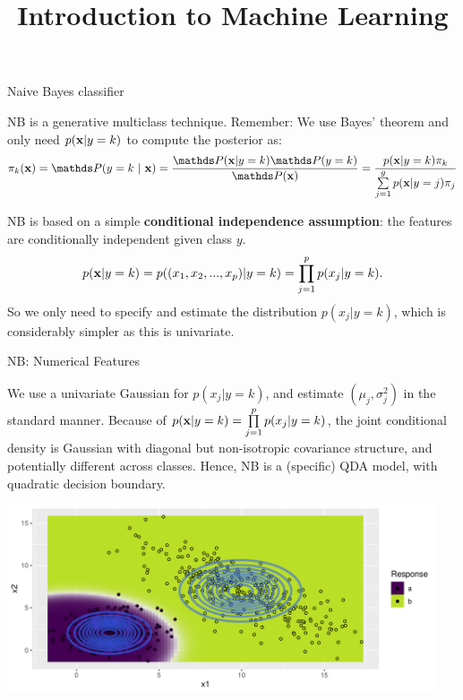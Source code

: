 \documentclass[11pt,compress,t,notes=noshow, xcolor=table]{beamer}
\title{Introduction to Machine Learning}
\begin{document}

\framebreak

\begin{vbframe}{Naive Bayes classifier}

NB is a generative multiclass technique. Remember: We use Bayes' theorem and only need $p(\mathbf{x} | y= k)$ to compute the posterior as:
$$\pikx = \postk = \frac{\P(\xv | y = k) \P(y = k)}{\P(\xv)} = \frac{\pdfxyk \pik}{\sumjg \pdfxyk[j] \pi_j} $$


NB is based on a simple \textbf{conditional independence assumption}: the features are conditionally independent given class $y$.
$$
p(\mathbf{x} | y= k) = p((x_1, x_2, ..., x_p)|y = k)=\prod\limits_{j=1}^p p(x_j|y = k).
$$
So we only need to specify and estimate the distribution $p(x_j|y = k)$, which is considerably simpler as this is univariate.

\end{vbframe}


\begin{vbframe}{NB: Numerical Features}

We use a univariate Gaussian for $p(x_j | y=k)$, and estimate $(\mu_j, \sigma^2_j)$ in the standard manner. Because of $p(\mathbf{x} | y= k) = \prod\limits_{j=1}^p p(x_j|y = k)$, the joint conditional density is Gaussian with diagonal but non-isotropic covariance structure, and potentially different across classes. Hence, NB is a (specific) QDA model, with quadratic decision boundary.

\begin{knitrout}\scriptsize
{}\color{fgcolor}

{\centering \includegraphics[width=0.95\textwidth]{figure/reg_class_nb_1} 

}



\end{knitrout}
\end{vbframe}
\end{document}
